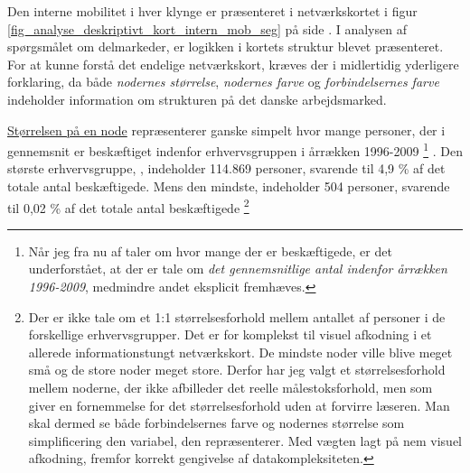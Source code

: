 
Den interne mobilitet i hver klynge er præsenteret i netværkskortet i figur \ref{fig_analyse_deskriptivt_kort_intern_mob_seg} på side . I analysen af spørgsmålet om delmarkeder, er logikken i kortets struktur blevet præsenteret. For at kunne forstå det endelige netværkskort, kræves der i midlertidig yderligere forklaring, da både \emph{nodernes størrelse}, \emph{nodernes farve} og \emph{forbindelsernes farve} indeholder information om strukturen på det danske arbejdsmarked.

\underline{Størrelsen på en node} repræsenterer ganske simpelt hvor mange personer, der i gennemsnit er beskæftiget indenfor erhvervsgruppen i årrækken 1996-2009%
%
\footnote{Når jeg fra nu af taler om hvor mange der er beskæftigede, er det underforstået, at der er tale om \emph{det gennemsnitlige antal indenfor årrækken 1996-2009}, medmindre andet eksplicit fremhæves.}%
%
. Den største erhvervsgruppe, , indeholder 114.869 personer, svarende til 4,9 \% af det totale antal beskæftigede. Mens den mindste,  indeholder 504 personer, svarende til 0,02 \% af det totale antal beskæftigede
%
\footnote{Der er ikke tale om et 1:1 størrelsesforhold mellem antallet af personer i de forskellige erhvervsgrupper. Det er for komplekst til visuel afkodning i et allerede informationstungt netværkskort. De mindste noder ville blive meget små og de store noder meget store. Derfor har jeg valgt et størrelsesforhold mellem noderne, der ikke afbilleder det reelle målestoksforhold, men som giver en fornemmelse for det størrelsesforhold uden at forvirre læseren. Man skal dermed se både forbindelsernes farve og nodernes størrelse som simplificering den variabel, den repræsenterer. Med vægten lagt på nem visuel afkodning, fremfor korrekt gengivelse af datakompleksiteten.}%
%

